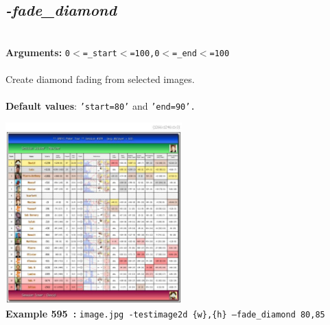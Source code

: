 \documentclass[a4paper,11pt,twoside]{book}
\begin{document}
\subsection{\emph{-fade\_diamond} }\vspace*{-0.5em}
~\\\textbf{Arguments: } 
{\small \texttt{0$<$=\_start$<$=100,0$<$=\_end$<$=100}}\\~\\
Create diamond fading from selected images.
~\\~\\\textbf{Default values}: {\small \texttt{'start=80'} and \texttt{'end=90'.}}
\begin{center}\includegraphics[keepaspectratio=true,height=7cm,width=\textwidth]{img/gmic_def595.jpg}\\
{\footnotesize \textbf{Example 595~:} \texttt{image.jpg -testimage2d \{w\},\{h\} --fade\_diamond 80,85}}
\end{center}
\end{document}
